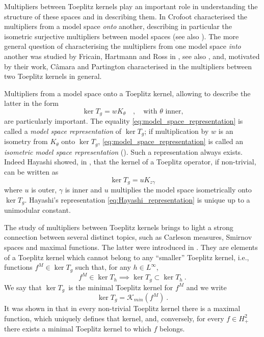 \documentclass{article}
\numberwithin{equation}{section}
\theoremstyle{plain}
\newcommand{\Hp}{\ensuremath{H^2_+}}
\newcommand{\Linf}{\ensuremath{L^\infty}}
\newcommand{\KK}{\ensuremath{\mathcal{K}}}
\newcommand{\kertg}{\ensuremath{\ker T_g}}
\newcommand{\kerth}{\ensuremath{\ker T_h}}
\begin{document}
Multipliers between Toeplitz kernels play an important role in understanding the structure of these spaces and in describing them.
In \cite{Cro94} Crofoot characterised the multipliers from a model space \emph{onto} another, describing in particular the isometric surjective multipliers between model spaces (see also \cite{Sa07}).
The more general question of characterising the multipliers from one model space \emph{into} another was studied by Fricain, Hartmann and Ross in \cite{FriHarRoss18}, see also \cite{FriRu18}, and, motivated by their work, C\^amara and Partington characterised in \cite{CP18_multipliers} the multipliers between two Toeplitz kernels in general.


Multipliers from a model space onto a Toeplitz kernel, allowing to describe the latter in the form
\begin{equation}
\label{eq:model_space_representation}
\kertg = w K_\theta \quad , \quad \text{with } \theta \text{ inner,}
\end{equation}
are particularly important.
The equality \eqref{eq:model_space_representation} is called a {\em model space representation} of \kertg;
if multiplication by $w$ is an isometry from $K_\theta$ onto \kertg, \eqref{eq:model_space_representation} is called an {\em isometric model space representation} (\cite{CCD25}).
Such a representation always exists.
Indeed Hayashi showed, in \cite{Ha86}, that the kernel of a Toeplitz operator, if non-trivial, can be written as
\begin{equation}
\label{eq:Hayashi_representation}
\kertg = u K_{z\gamma}
\end{equation}
where $u$ is outer, $\gamma$ is inner and $u$ multiplies the model space isometrically onto \kertg.
Hayashi's representation \eqref{eq:Hayashi_representation} is unique up to a unimodular constant.


The study of multipliers between Toeplitz kernels brings to light a strong connection between several distinct topics, such as Carleson measures, Smirnov spaces and maximal functions.
The latter were introduced in \cite{CP14}. They are elements of a Toeplitz kernel which cannot belong to any ``smaller'' Toeplitz kernel, i.e., functions $f^M \in \kertg$ such that, for any $h\in\Linf$,
\begin{equation}
f^M \in \kerth \implies \kertg \subset \kerth\ .
\end{equation}
We say that \kertg\ is the minimal Toeplitz kernel for $f^M$ and we write
\begin{equation}
\kertg = \KK_{min}(f^M)\ .
\end{equation}
It was shown in \cite{CP14} that in every non-trivial Toeplitz kernel there is a maximal function, which uniquely defines that kernel, and, conversely, for every $f\in\Hp$ there exists a minimal Toeplitz kernel to which $f$ belongs.
\end{document}
